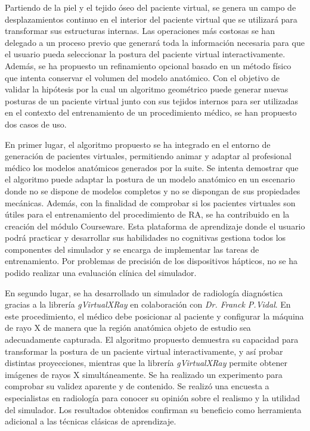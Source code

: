 Partiendo de la piel y el tejido óseo del paciente virtual, se genera un campo de desplazamientos continuo en el interior del paciente virtual que se utilizará para transformar sus estructuras internas. Las operaciones más costosas se han delegado a un proceso previo que generará toda la información necesaria para que el usuario pueda seleccionar la postura del paciente virtual interactivamente. Además, se ha propuesto un refinamiento opcional basado en un método físico que intenta conservar el volumen del modelo anatómico. Con el objetivo de validar la hipótesis por la cual un algoritmo geométrico puede generar nuevas posturas de un paciente virtual junto con sus tejidos internos para ser utilizadas en el contexto del entrenamiento de un procedimiento médico, se han propuesto dos casos de uso. 

En primer lugar, el algoritmo propuesto se ha integrado en el entorno de generación de pacientes virtuales, permitiendo animar y adaptar al profesional médico los modelos anatómicos generados por la suite. Se intenta demostrar que el algoritmo puede adaptar la postura de un modelo anatómico en un escenario donde no se dispone de modelos completos y no se dispongan de sus propiedades mecánicas. Además, con la finalidad de comprobar si los pacientes virtuales son útiles para  el entrenamiento del procedimiento de RA, se ha contribuido en la creación del módulo Courseware. Esta plataforma de aprendizaje donde el usuario podrá practicar y desarrollar sus habilidades no cognitivas gestiona todos los componentes del simulador y se encarga de implementar las tareas de entrenamiento. Por problemas de precisión de los dispositivos hápticos, no se ha podido realizar una evaluación clínica del simulador. 



En segundo lugar, se ha desarrollado un simulador de radiología diagnóstica gracias a la librería \emph{gVirtualXRay} en colaboración con \emph{Dr. Franck P.Vidal}. En este procedimiento, el médico debe posicionar al paciente y configurar la máquina de rayo X de manera que la región anatómica objeto de estudio sea adecuadamente capturada. El algoritmo propuesto demuestra su capacidad para transformar la postura de un paciente virtual interactivamente, y así probar distintas proyecciones, mientras que la librería \emph{gVirtualXRay} permite  obtener imágenes de rayos X simultáneamente. Se ha realizado un experimento para comprobar su validez aparente y de contenido. Se realizó una encuesta a especialistas en radiología para conocer su opinión sobre el realismo y la utilidad del simulador. Los resultados obtenidos confirman su beneficio como herramienta adicional a las técnicas clásicas de aprendizaje.



